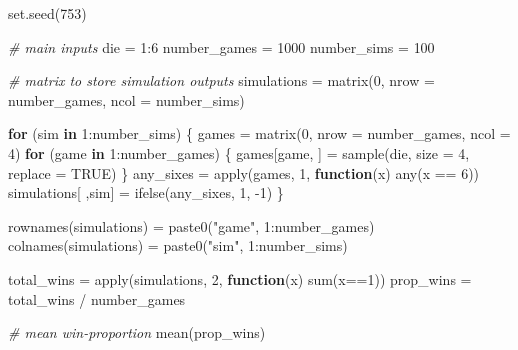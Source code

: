 \documentclass[
]{book}
\newenvironment{Shaded}{\begin{snugshade}}{\end{snugshade}}
\newcommand{\AttributeTok}[1]{\textcolor[rgb]{0.77,0.63,0.00}{#1}}
\newcommand{\CommentTok}[1]{\textcolor[rgb]{0.56,0.35,0.01}{\textit{#1}}}
\newcommand{\ConstantTok}[1]{\textcolor[rgb]{0.00,0.00,0.00}{#1}}
\newcommand{\ControlFlowTok}[1]{\textcolor[rgb]{0.13,0.29,0.53}{\textbf{#1}}}
\newcommand{\DecValTok}[1]{\textcolor[rgb]{0.00,0.00,0.81}{#1}}
\newcommand{\FunctionTok}[1]{\textcolor[rgb]{0.00,0.00,0.00}{#1}}
\newcommand{\NormalTok}[1]{#1}
\newcommand{\OtherTok}[1]{\textcolor[rgb]{0.56,0.35,0.01}{#1}}
\newcommand{\SpecialCharTok}[1]{\textcolor[rgb]{0.00,0.00,0.00}{#1}}
\newcommand{\StringTok}[1]{\textcolor[rgb]{0.31,0.60,0.02}{#1}}
\begin{document}
\begin{Shaded}
\begin{Highlighting}[]
\FunctionTok{set.seed}\NormalTok{(}\DecValTok{753}\NormalTok{)}

\CommentTok{\# main inputs}
\NormalTok{die }\OtherTok{=} \DecValTok{1}\SpecialCharTok{:}\DecValTok{6}
\NormalTok{number\_games }\OtherTok{=} \DecValTok{1000}
\NormalTok{number\_sims }\OtherTok{=} \DecValTok{100}

\CommentTok{\# matrix to store simulation outputs}
\NormalTok{simulations }\OtherTok{=} \FunctionTok{matrix}\NormalTok{(}\DecValTok{0}\NormalTok{, }\AttributeTok{nrow =}\NormalTok{ number\_games, }\AttributeTok{ncol =}\NormalTok{ number\_sims)}

\ControlFlowTok{for}\NormalTok{ (sim }\ControlFlowTok{in} \DecValTok{1}\SpecialCharTok{:}\NormalTok{number\_sims) \{}
\NormalTok{  games }\OtherTok{=} \FunctionTok{matrix}\NormalTok{(}\DecValTok{0}\NormalTok{, }\AttributeTok{nrow =}\NormalTok{ number\_games, }\AttributeTok{ncol =} \DecValTok{4}\NormalTok{)}
  \ControlFlowTok{for}\NormalTok{ (game }\ControlFlowTok{in} \DecValTok{1}\SpecialCharTok{:}\NormalTok{number\_games) \{}
\NormalTok{    games[game, ] }\OtherTok{=} \FunctionTok{sample}\NormalTok{(die, }\AttributeTok{size =} \DecValTok{4}\NormalTok{, }\AttributeTok{replace =} \ConstantTok{TRUE}\NormalTok{)}
\NormalTok{  \}}
\NormalTok{  any\_sixes }\OtherTok{=} \FunctionTok{apply}\NormalTok{(games, }\DecValTok{1}\NormalTok{, }\ControlFlowTok{function}\NormalTok{(x) }\FunctionTok{any}\NormalTok{(x }\SpecialCharTok{==} \DecValTok{6}\NormalTok{))}
\NormalTok{  simulations[ ,sim] }\OtherTok{=} \FunctionTok{ifelse}\NormalTok{(any\_sixes, }\DecValTok{1}\NormalTok{, }\SpecialCharTok{{-}}\DecValTok{1}\NormalTok{)}
\NormalTok{\}}

\FunctionTok{rownames}\NormalTok{(simulations) }\OtherTok{=} \FunctionTok{paste0}\NormalTok{(}\StringTok{"game"}\NormalTok{, }\DecValTok{1}\SpecialCharTok{:}\NormalTok{number\_games)}
\FunctionTok{colnames}\NormalTok{(simulations) }\OtherTok{=} \FunctionTok{paste0}\NormalTok{(}\StringTok{"sim"}\NormalTok{, }\DecValTok{1}\SpecialCharTok{:}\NormalTok{number\_sims)}

\NormalTok{total\_wins }\OtherTok{=} \FunctionTok{apply}\NormalTok{(simulations, }\DecValTok{2}\NormalTok{, }\ControlFlowTok{function}\NormalTok{(x) }\FunctionTok{sum}\NormalTok{(x}\SpecialCharTok{==}\DecValTok{1}\NormalTok{))}
\NormalTok{prop\_wins }\OtherTok{=}\NormalTok{ total\_wins }\SpecialCharTok{/}\NormalTok{ number\_games}

\CommentTok{\# mean win{-}proportion}
\FunctionTok{mean}\NormalTok{(prop\_wins)}
\end{Highlighting}
\end{Shaded}
\end{document}

